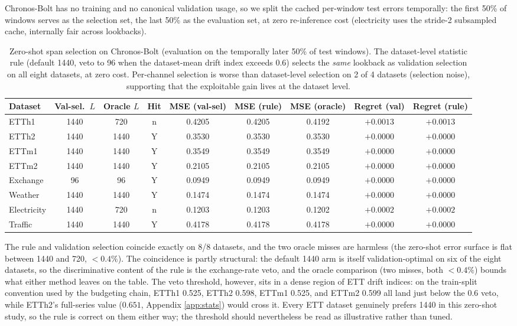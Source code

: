 Chronos-Bolt has no training and no canonical validation usage, so we split the cached per-window test errors temporally: the first 50\% of windows serves as the selection set, the last 50\% as the evaluation set, at zero re-inference cost (electricity uses the stride-2 subsampled cache, internally fair across lookbacks).

\begin{table}[t]
\caption{Zero-shot span selection on Chronos-Bolt (evaluation on the temporally later 50\% of test windows). The dataset-level statistic rule (default 1440, veto to 96 when the dataset-mean drift index exceeds $0.6$) selects the \emph{same} lookback as validation selection on all eight datasets, at zero cost. Per-channel selection is worse than dataset-level selection on 2 of 4 datasets (selection noise), supporting that the exploitable gain lives at the dataset level.}
\label{tab:select_chronos}
\centering\footnotesize
\begin{tabular}{lccc ccc cc}
\toprule
Dataset & Val-sel.\ $L$ & Oracle $L$ & Hit & MSE (val-sel) & MSE (rule) & MSE (oracle) & Regret (val) & Regret (rule) \\
\midrule
ETTh1 & 1440 & 720 & n & 0.4205 & 0.4205 & 0.4192 & $+0.0013$ & $+0.0013$ \\
ETTh2 & 1440 & 1440 & Y & 0.3530 & 0.3530 & 0.3530 & $+0.0000$ & $+0.0000$ \\
ETTm1 & 1440 & 1440 & Y & 0.3549 & 0.3549 & 0.3549 & $+0.0000$ & $+0.0000$ \\
ETTm2 & 1440 & 1440 & Y & 0.2105 & 0.2105 & 0.2105 & $+0.0000$ & $+0.0000$ \\
Exchange & 96 & 96 & Y & 0.0949 & 0.0949 & 0.0949 & $+0.0000$ & $+0.0000$ \\
Weather & 1440 & 1440 & Y & 0.1474 & 0.1474 & 0.1474 & $+0.0000$ & $+0.0000$ \\
Electricity & 1440 & 720 & n & 0.1203 & 0.1203 & 0.1202 & $+0.0002$ & $+0.0002$ \\
Traffic & 1440 & 1440 & Y & 0.4178 & 0.4178 & 0.4178 & $+0.0000$ & $+0.0000$ \\
\bottomrule
\end{tabular}
\end{table}

The rule and validation selection coincide exactly on 8/8 datasets, and the two oracle misses are harmless (the zero-shot error surface is flat between 1440 and 720, $<0.4\%$). The coincidence is partly structural: the default 1440 arm is itself validation-optimal on six of the eight datasets, so the discriminative content of the rule is the exchange-rate veto, and the oracle comparison (two misses, both $<0.4\%$) bounds what either method leaves on the table. The veto threshold, however, sits in a dense region of ETT drift indices: on the train-split convention used by the budgeting chain, ETTh1 0.525, ETTh2 0.598, ETTm1 0.525, and ETTm2 0.599 all land just below the $0.6$ veto, while ETTh2's full-series value ($0.651$, Appendix \ref{app:stats}) would cross it. Every ETT dataset genuinely prefers 1440 in this zero-shot study, so the rule is correct on them either way; the threshold should nevertheless be read as illustrative rather than tuned.


